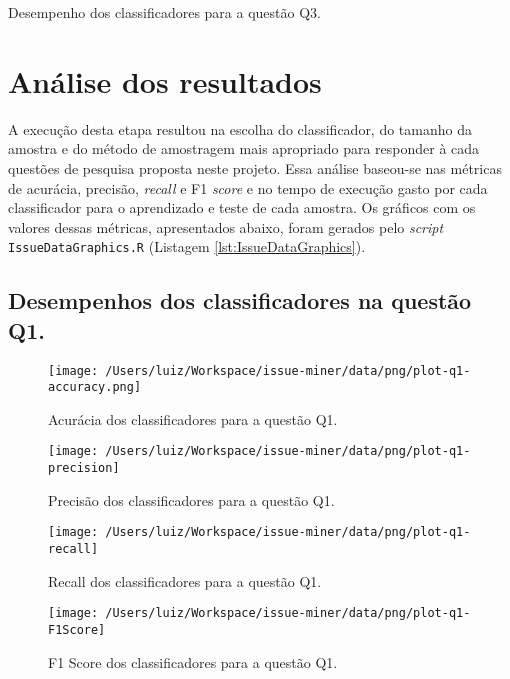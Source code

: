 \documentclass[11pt,twoside]{article}
\begin{document}
\begin{sidewaystable}[ph!]
  \begin{center}
  \tiny
  \pgfplotstabletypeset[]{\loadedtable}
  \end{center}
  \caption{Desempenho dos classificadores para a questão Q3.}
  \label{tab:desempenho-para-q3}
\end{sidewaystable}

\pagebreak
\section{Análise dos resultados}
A execução desta etapa resultou na escolha do classificador, do tamanho 
da amostra e do método de amostragem mais apropriado para responder à 
cada questões de pesquisa proposta neste projeto. Essa análise baseou-se nas 
métricas de acurácia, precisão, \textit{recall} e F1 \textit{score}\cite{JAS} e
no tempo de execução gasto por cada classificador para o aprendizado e teste de
cada amostra. Os gráficos com os valores  dessas métricas, apresentados abaixo, foram gerados pelo \textit{script} \texttt{IssueDataGraphics.R} (Listagem \ref{lst:IssueDataGraphics}).

\subsection{Desempenhos dos classificadores na questão Q1.}
\begin{figure}[!ht]
  \centering
  \texttt{[image: /Users/luiz/Workspace/issue-miner/data/png/plot-q1-accuracy.png]}
  \caption{Acurácia dos classificadores para a questão Q1.}
\end{figure}

\pagebreak
\begin{figure}[!ht]
  \centering
  \texttt{[image: /Users/luiz/Workspace/issue-miner/data/png/plot-q1-precision]}
  \caption{Precisão dos classificadores para a questão Q1.}
\end{figure}

\pagebreak
\begin{figure}[!ht]
  \centering
  \texttt{[image: /Users/luiz/Workspace/issue-miner/data/png/plot-q1-recall]}
  \caption{Recall dos classificadores para a questão Q1.}
\end{figure}

\pagebreak
\begin{figure}[!ht]
  \texttt{[image: /Users/luiz/Workspace/issue-miner/data/png/plot-q1-F1Score]}
  \caption{F1 Score dos classificadores para a questão Q1.}
\end{figure}
\end{document}
